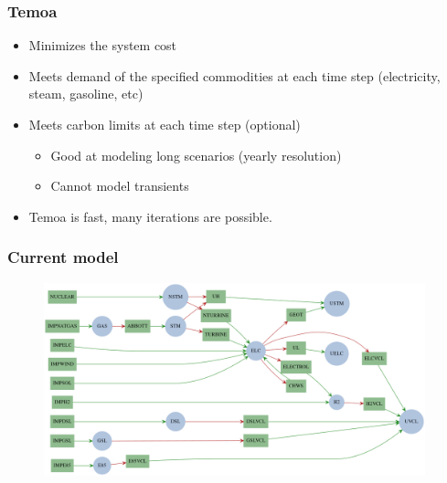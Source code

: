 
\begin{frame}
\frametitle{Temoa}
	\begin{itemize}
		\item Minimizes the system cost
		\item Meets demand of the specified commodities at each time step (electricity, steam, gasoline, etc)
		\item Meets carbon limits at each time step (optional)
		\begin{itemize}
			\item Good at modeling long scenarios (yearly resolution)
			\item Cannot model transients
		\end{itemize}
		\item Temoa is fast, many iterations are possible.
	\end{itemize}
\end{frame}


\begin{frame}
\frametitle{Current model}

	\begin{figure}[htbp!]
		\begin{center}
			\includegraphics[height=5.6cm]{images/scenario11.png}
		\end{center}
	\end{figure}

\end{frame}



